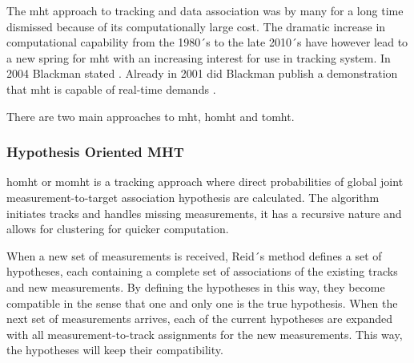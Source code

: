 The \gls{mht} approach to tracking and data association was by many for a long time dismissed because of its computationally large cost. The dramatic increase in computational capability from the 1980´s to the late 2010´s have however lead to a new spring for \gls{mht} with an increasing interest for use in tracking system. In 2004 Blackman stated \cite{Blackman2004}. Already in 2001 did Blackman publish a demonstration that \gls{mht} is capable of real-time demands \cite{Blackman2001}.

There are two main approaches to \gls{mht}, \gls{homht} and \gls{tomht}.

\subsubsection{Hypothesis Oriented MHT}
\gls{homht} or \gls{momht} is a tracking approach where direct probabilities of global joint measurement-to-target association hypothesis are calculated. The algorithm initiates tracks and handles missing \glspl{measurement}, it has a recursive nature and allows for clustering for quicker computation.

When a new set of \glspl{measurement} is received, Reid´s method \cite{Reid1979} defines a set of hypotheses, each containing a complete set of associations of the existing tracks and new \glspl{measurement}. By defining the hypotheses in this way, they become compatible in the sense that one and only one is the true hypothesis. When the next set of \glspl{measurement} arrives, each of the current hypotheses are expanded with all measurement-to-track assignments for the new \glspl{measurement}. This way, the hypotheses will keep their compatibility.

